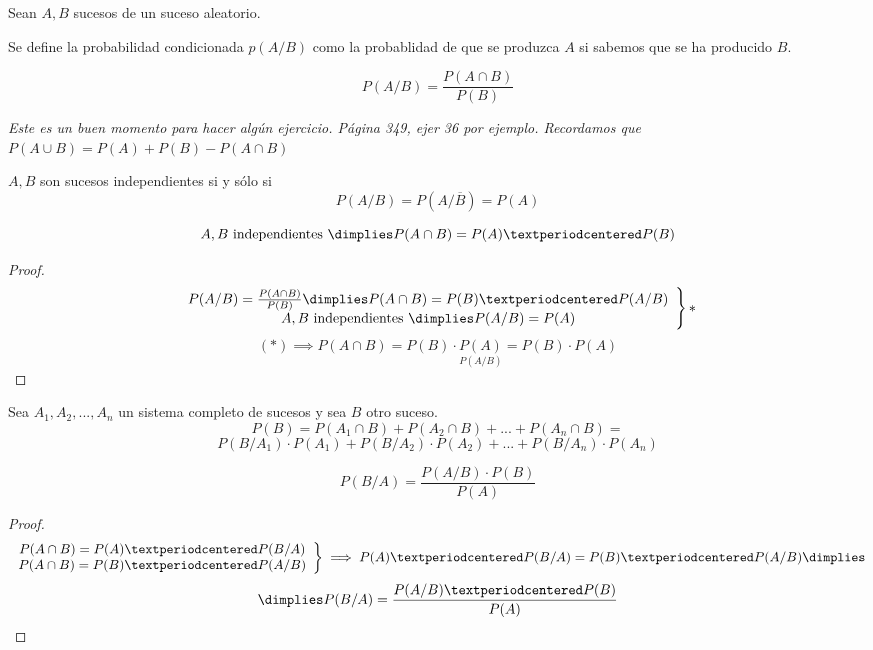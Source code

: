 \begin{defn}
Sean $A,B$ sucesos de un suceso aleatorio. 

Se define la probabilidad condicionada $p(A/B)$ como la probablidad de que se produzca $A$ si sabemos que se ha producido $B$.

\[P(A/B) = \frac{P(A\cap B)}{P(B)}\]
\end{defn}

\textit{Este es un buen momento para hacer algún ejercicio. Página 349, ejer 36 por ejemplo. Recordamos que $P(A\cup B) = P(A) + P(B) - P(A\cap B)$}

\begin{defn}
$A,B$ son sucesos independientes si y sólo si \[P(A/B) = P(A/\overline{B}) = P(A)\]
\end{defn}

\begin{theorem}
\[A,B \text{ independientes } \dimplies P(A\cap B) = P(A)·P(B)\]
\end{theorem}
\begin{proof}
\[\left.\begin{array}{c}
P(A/B) = \frac{P(A\cap B)}{P(B)} \dimplies P(A\cap B) = P(B)·P(A/B)\\A,B \text{ independientes } \dimplies P(A/B) = P(A)\end{array}\right\}*\]
\[(*) \implies P(A\cap B) = P(B)·\underset{P(A/B)}{P(A)} = P(B)·P(A)\]
\end{proof}

\begin{theorem}
Sea $A_1,A_2,...,A_n$ un sistema completo de sucesos y sea $B$ otro suceso.
\[  
    P(B) = P(A_1\cap B) + P(A_2\cap B) + ... + P(A_n\cap B) = 
\]
\[
    P(B/A_1)·P(A_1) + P(B/A_2) · P(A_2) + ... + P(B/A_n)·P(A_n)
\]
\end{theorem}
\begin{theorem}
\[P(B/A) = \frac{P(A/B)·P(B)}{P(A)}\]
\end{theorem}
\begin{proof}
\[
\left.
\begin{array}{c}
    P(A\cap B) = P(A)·P(B/A)\\
    P(A\cap B) = P(B)·P(A/B)
\end{array}\right\} \implies P(A)·P(B/A) =  P(B)·P(A/B) \dimplies \]\[\dimplies P(B/A) = \frac{P(A/B)·P(B)}{P(A)} 
\]
\end{proof}
